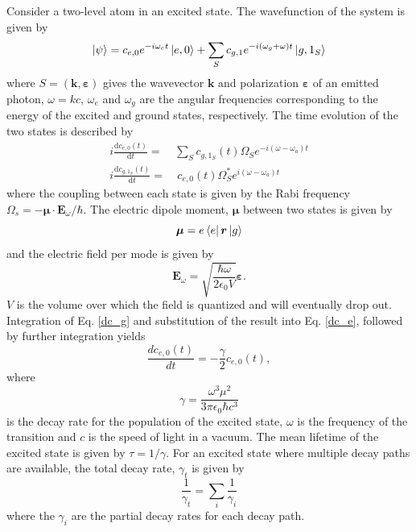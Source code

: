 Consider a two-level atom in an excited state. The wavefunction of the system is given by
\begin{equation}
\ket{\psi} = c_{e,0}e^{-i\omega_et}\ket{e,0} + \sum_Sc_{g,1}e^{-i(\omega_g+\omega)t}\ket{g,1_S}
\end{equation}
where $S = (\bm{k},\bm{\varepsilon})$ gives the wavevector $\bm{k}$ and polarization $\bm{\varepsilon}$ of an emitted photon, $\omega = kc$, $\omega_e$ and $\omega_g$ are the angular frequencies corresponding to the energy of the excited and ground states, respectively\cite{LasCool}. The time evolution of the two states is described by
\begin{align}
i\frac{\mathrm{d}c_{e,0}(t)}{\mathrm{d}t} =& \sum_Sc_{g,1_S}(t)\Omega_S e^{-i(\omega-\omega_a)t} \label{dc_e} \\
i\frac{\mathrm{d}c_{g,1_S}(t)}{\mathrm{d}t} =& \ c_{e,0}(t)\Omega_S^*e^{i(\omega-\omega_a)t} \label{dc_g}
\end{align}
where the coupling between each state is given by the Rabi frequency \\$\Omega_s = -\bm{\mu}\cdot\bm{E}_{\omega}/\hbar$. The electric dipole moment, $\bm{\mu}$ between two states is given by
\begin{equation}
\bm{\mu} = e\bra{e}\bm{r}\ket{g} 
\end{equation}
and the electric field per mode is given by
\begin{equation}
\bm{E}_{\omega} = \sqrt{\frac{\hbar\omega}{2\epsilon_0V}}\bm{\varepsilon}.
\end{equation}
$V$ is the volume over which the field is quantized and will eventually drop out. Integration of Eq. \ref{dc_g} and substitution of the result into Eq. \ref{dc_e}, followed by further integration yields 
\begin{equation}
\frac{d c_{e,0}(t)}{dt} = -\frac{\gamma}{2}c_{e,0}(t),
\end{equation}
where
\begin{equation}
\gamma = \frac{\omega^3\mu^2}{3\pi\epsilon_0\hbar c^3}
\label{gamma}
\end{equation}
is the decay rate for the population of the excited state, $\omega$ is the frequency of the transition and $c$ is the speed of light in a vacuum. The mean lifetime of the excited state is given by $\tau = 1/\gamma$. For an excited state where multiple decay paths are available, the total decay rate, $\gamma_t$ is given by
\begin{equation}
\frac{1}{\gamma_t} = \sum_i \frac{1}{\gamma_i}
\label{totdec}
\end{equation}
where the $\gamma_i$ are the partial decay rates for each decay path.


